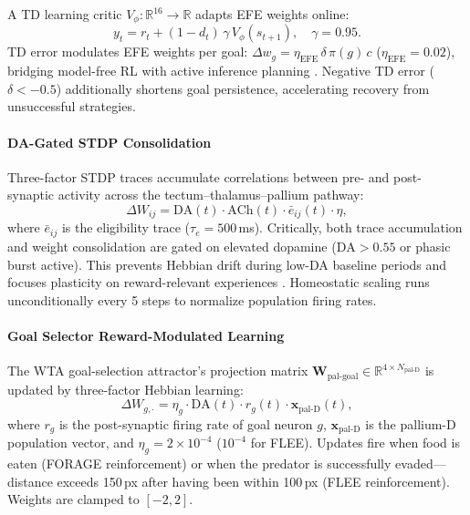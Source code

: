 \documentclass[12pt]{article}
\begin{document}
A TD learning critic $V_\phi: \mathbb{R}^{16} \to \mathbb{R}$
adapts EFE weights online:
\begin{equation}\label{eq:td}
  y_t = r_t + (1-d_t)\,\gamma\,V_\phi(s_{t+1}), \quad \gamma = 0.95.
\end{equation}
TD error modulates EFE weights per goal:
$\Delta w_g = \eta_\text{EFE}\,\delta\,\pi(g)\,c$
($\eta_\text{EFE} = 0.02$), bridging model-free RL with active
inference planning \citep{sutton2018}.
Negative TD error ($\delta < -0.5$) additionally shortens goal
persistence, accelerating recovery from unsuccessful strategies.

\paragraph{DA-Gated STDP Consolidation}

Three-factor STDP traces accumulate correlations between pre- and
post-synaptic activity across the tectum--thalamus--pallium pathway:
\begin{equation}\label{eq:stdp}
  \Delta W_{ij} = \text{DA}(t) \cdot \text{ACh}(t) \cdot
    \bar{e}_{ij}(t) \cdot \eta,
\end{equation}
where $\bar{e}_{ij}$ is the eligibility trace ($\tau_e = 500$\,ms).
Critically, both trace accumulation and weight consolidation are
gated on elevated dopamine ($\text{DA} > 0.55$ or phasic burst
active).
This prevents Hebbian drift during low-DA baseline periods and
focuses plasticity on reward-relevant experiences
\citep{schultz1997,fremaux2016}.
Homeostatic scaling runs unconditionally every 5 steps to normalize
population firing rates.

\paragraph{Goal Selector Reward-Modulated Learning}

The WTA goal-selection attractor's projection matrix
$\mathbf{W}_\text{pal-goal} \in \mathbb{R}^{4 \times N_\text{pal-D}}$
is updated by three-factor Hebbian learning:
\begin{equation}\label{eq:goal_stdp}
  \Delta W_{g,\cdot} = \eta_g \cdot \text{DA}(t) \cdot
    r_g(t) \cdot \mathbf{x}_\text{pal-D}(t),
\end{equation}
where $r_g$ is the post-synaptic firing rate of goal neuron $g$,
$\mathbf{x}_\text{pal-D}$ is the pallium-D population vector,
and $\eta_g = 2 \times 10^{-4}$ ($10^{-4}$ for FLEE).
Updates fire when food is eaten (FORAGE reinforcement) or when the
predator is successfully evaded---distance exceeds 150\,px after
having been within 100\,px (FLEE reinforcement).
Weights are clamped to $[-2, 2]$.
\end{document}
